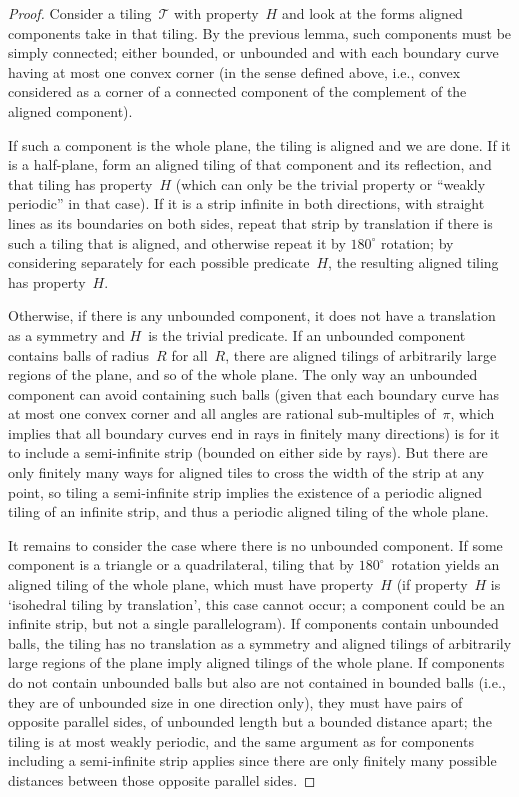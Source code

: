 \begin{proof}
Consider a tiling~$\mathcal{T}$ with property~$H$ and look at the
forms aligned components take in that tiling.  By the previous lemma,
such components must be simply connected; either bounded, or unbounded
and with each boundary curve having at most one convex corner (in the
sense defined above, i.e., convex considered as a corner of a
connected component of the complement of the aligned component).

If such a component is the whole plane, the tiling is aligned and we
are done.  If it is a half-plane, form an aligned tiling of that
component and its reflection, and that tiling has property~$H$ (which
can only be the trivial property or ``weakly periodic'' in that case).
If it is a strip infinite in both directions, with straight lines as
its boundaries on both sides, repeat that strip by translation if
there is such a tiling that is aligned, and otherwise repeat it by
$180^\circ$ rotation; by considering separately for each possible
predicate~$H$, the resulting aligned tiling has property~$H$.

Otherwise, if there is any unbounded component, it does not have a
translation as a symmetry and $H$~is the trivial predicate.  If an
unbounded component contains balls of radius~$R$ for all~$R$, there
are aligned tilings of arbitrarily large regions of the plane, and so
of the whole plane.  The only way an unbounded component can avoid
containing such balls (given that each boundary curve has at most one
convex corner and all angles are rational sub-multiples of~$\pi$, which
implies that all boundary curves end in rays in finitely many
directions) is for it to include a semi-infinite strip (bounded on
either side by rays).  But there are only finitely many ways for
aligned tiles to cross the width of the strip at any point, so tiling
a semi-infinite strip implies the existence of a periodic aligned
tiling of an infinite strip, and thus a periodic aligned tiling of the
whole plane.

It remains to consider the case where there is no unbounded component.
If some component is a triangle or a quadrilateral, tiling that by
$180^\circ$~rotation yields an aligned tiling of the whole plane,
which must have property~$H$ (if property~$H$ is `isohedral tiling by
translation', this case cannot occur; a component could be an infinite
strip, but not a single parallelogram).  If components contain
unbounded balls, the tiling has no translation as a symmetry and
aligned tilings of arbitrarily large regions of the plane imply
aligned tilings of the whole plane.  If components do not contain
unbounded balls but also are not contained in bounded balls (i.e.,
they are of unbounded size in one direction only), they must have
pairs of opposite parallel sides, of unbounded length but a bounded
distance apart; the tiling is at most weakly periodic, and the same
argument as for components including a semi-infinite strip applies
since there are only finitely many possible distances between those
opposite parallel sides.


\end{proof}
